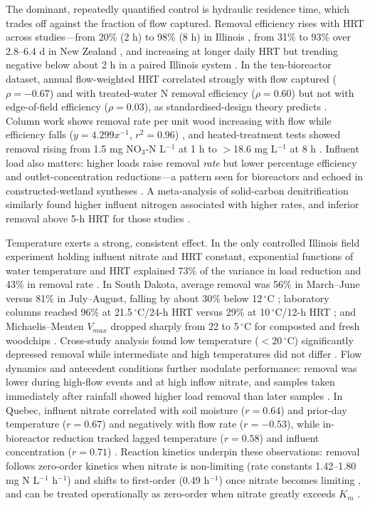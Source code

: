 \documentclass[11pt]{article}
\begin{document}
The dominant, repeatedly quantified control is hydraulic residence time, which trades off against the fraction of flow captured. Removal efficiency rises with HRT across studies---from 20\% (2 h) to 98\% (8 h) in Illinois \parencite{Bell2015}, from 31\% to 93\% over 2.8--6.4 d in New Zealand \parencite{Rivas2020}, and increasing at longer daily HRT but trending negative below about 2 h in a paired Illinois system \parencite{Maxwell2022}. In the ten-bioreactor dataset, annual flow-weighted HRT correlated strongly with flow captured ($\rho=-0.67$) and with treated-water N removal efficiency ($\rho=0.60$) but not with edge-of-field efficiency ($\rho=0.03$), as standardised-design theory predicts \parencite{Christianson2026}. Column work shows removal rate per unit wood increasing with flow while efficiency falls ($y=4.299x^{-1}$, $r^2=0.96$) \parencite{Greenan2009}, and heated-treatment tests showed removal rising from 1.5 mg NO$_3$-N L$^{-1}$ at 1 h to $>$18.6 mg L$^{-1}$ at 8 h \parencite{Ma2021}. Influent load also matters: higher loads raise removal \emph{rate} but lower percentage efficiency and outlet-concentration reductions---a pattern seen for bioreactors \parencite{Rivas2020,Christianson2026} and echoed in constructed-wetland syntheses \parencite{Mendes2021}. A meta-analysis of solid-carbon denitrification similarly found higher influent nitrogen associated with higher rates, and inferior removal above 5-h HRT for those studies \parencite{Zhang2021b}.

Temperature exerts a strong, consistent effect. In the only controlled Illinois field experiment holding influent nitrate and HRT constant, exponential functions of water temperature and HRT explained 73\% of the variance in load reduction and 43\% in removal rate \parencite{Bell2015}. In South Dakota, average removal was 56\% in March--June versus 81\% in July--August, falling by about 30\% below 12\,$^{\circ}$C \parencite{Thapa2023}; laboratory columns reached 96\% at 21.5\,$^{\circ}$C/24-h HRT versus 29\% at 10\,$^{\circ}$C/12-h HRT \parencite{Soupir2018}; and Michaelis--Menten $V_{max}$ dropped sharply from 22 to 5\,$^{\circ}$C for composted and fresh woodchips \parencite{Kouanda2021}. Cross-study analysis found low temperature ($<$20\,$^{\circ}$C) significantly depressed removal while intermediate and high temperatures did not differ \parencite{Zhang2021b}. Flow dynamics and antecedent conditions further modulate performance: removal was lower during high-flow events and at high inflow nitrate, and samples taken immediately after rainfall showed higher load removal than later samples \parencite{Thapa2023}. In Quebec, influent nitrate correlated with soil moisture ($r=0.64$) and prior-day temperature ($r=0.67$) and negatively with flow rate ($r=-0.53$), while in-bioreactor reduction tracked lagged temperature ($r=0.58$) and influent concentration ($r=0.71$) \parencite{Husk2017}. Reaction kinetics underpin these observations: removal follows zero-order kinetics when nitrate is non-limiting (rate constants 1.42--1.80 mg N L$^{-1}$ h$^{-1}$) and shifts to first-order (0.49 h$^{-1}$) once nitrate becomes limiting \parencite{Hua2016}, and can be treated operationally as zero-order when nitrate greatly exceeds $K_m$ \parencite{Kouanda2021}.
\end{document}
